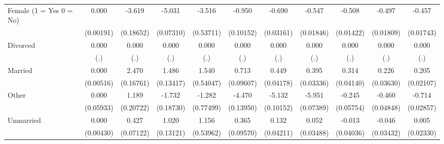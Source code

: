 {\begin{tabular}{l*{10}{c}}
Female (1 = Yes 0 = No)&       0.000         &      -3.619\sym{***}&      -5.031\sym{***}&      -3.516\sym{***}&      -0.950\sym{***}&      -0.690\sym{***}&      -0.547\sym{***}&      -0.508\sym{***}&      -0.497\sym{***}&      -0.457\sym{***}\\
                    &   (0.00191)         &   (0.18652)         &   (0.07310)         &   (0.53711)         &   (0.10152)         &   (0.03161)         &   (0.01846)         &   (0.01422)         &   (0.01809)         &   (0.01743)         \\
Divorced            &       0.000         &       0.000         &       0.000         &       0.000         &       0.000         &       0.000         &       0.000         &       0.000         &       0.000         &       0.000         \\
                    &         (.)         &         (.)         &         (.)         &         (.)         &         (.)         &         (.)         &         (.)         &         (.)         &         (.)         &         (.)         \\
Married             &       0.000         &       2.470\sym{***}&       1.486\sym{***}&       1.540\sym{**} &       0.713\sym{***}&       0.449\sym{***}&       0.395\sym{***}&       0.314\sym{***}&       0.226\sym{***}&       0.205\sym{***}\\
                    &   (0.00516)         &   (0.16761)         &   (0.13417)         &   (0.54047)         &   (0.09607)         &   (0.04178)         &   (0.03336)         &   (0.04140)         &   (0.03630)         &   (0.02107)         \\
Other               &       0.000         &       1.189\sym{***}&      -1.732\sym{***}&      -1.282         &      -4.470\sym{***}&      -5.132\sym{***}&      -5.951\sym{***}&      -0.245\sym{***}&      -0.460\sym{***}&      -0.714\sym{***}\\
                    &   (0.05933)         &   (0.20722)         &   (0.18730)         &   (0.77499)         &   (0.13950)         &   (0.10152)         &   (0.07389)         &   (0.05754)         &   (0.04848)         &   (0.02857)         \\
Unmarried           &       0.000         &       0.427\sym{***}&       1.020\sym{***}&       1.156\sym{*}  &       0.365\sym{***}&       0.132\sym{**} &       0.052         &      -0.013         &      -0.046         &       0.005         \\
                    &   (0.00430)         &   (0.07122)         &   (0.13121)         &   (0.53962)         &   (0.09570)         &   (0.04211)         &   (0.03488)         &   (0.04036)         &   (0.03432)         &   (0.02330)         \\

\end{tabular}}
